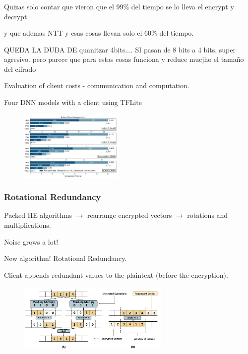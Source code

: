 \documentclass[10pt,handout]{beamer}
\begin{document}


\begin{frame}
\frametitle{}

Quizas solo contar que vieron que el 99\% del tiempo se lo lleva el encrypt y decrypt

y que ademas NTT y esas cosas llevan solo el 60\% del tiempo.

QUEDA LA DUDA DE quanitzar 4bits.... SI pasan de 8 bits a 4 bits, super agresivo.
pero parece que para estas cosas funciona y reduce mucjho el tamaño del cifrado

Evaluation of client costs - communication and computation.

Four DNN models with a client using TFLite
\begin{figure}
    \includegraphics[width=0.45\textwidth]{motivation.png}
\end{figure}

\end{frame}




\begin{frame}
\frametitle{Rotational Redundancy}

Packed HE algorithms $\rightarrow$  rearrange encrypted vectors $\rightarrow$ rotations and multiplications.

Noise grows a lot!



New algorithm! Rotational Redundancy.

    Client appends redundant values to the plaintext (before the encryption).
\begin{figure}
    \includegraphics[width=0.65\textwidth]{rotation.png}
\end{figure}



\end{frame}
\end{document}
